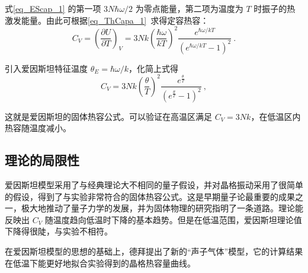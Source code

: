 式\autoref{eq_EScap_1} 的第一项 $3N \hbar\omega/2$ 为零点能量，第二项为温度为 $T$ 时振子的热激发能量。由此可根据\autoref{eq_ThCapa_1}~求得定容热容：
\begin{equation}
C_V=\left(\frac{\partial U}{\partial T}\right)_V=3Nk\left(\frac{\hbar \omega}{kT}\right)^2\frac{e^{\hbar \omega/kT}}{(e^{\hbar \omega/kT}-1)^2}~.
\end{equation}

引入爱因斯坦特征温度 $\theta_E=\hbar\omega/k$，化简上式得
\begin{equation}\label{eq_EScap_2}
C_V=3Nk\left(\frac{\theta}{T}\right)^2\frac{e^{\frac{\theta}{T}}}{(e^{\frac{\theta}{T}}-1)^2}~,
\end{equation}

这就是爱因斯坦的固体热容公式。可以验证在高温区满足 $C_V=3Nk$，在低温区内热容随温度减小。

\subsection{理论的局限性}
爱因斯坦模型采用了与经典理论大不相同的量子假设，并对晶格振动采用了很简单的假设，得到了与实验非常符合的固体热容公式。这是早期量子论最重要的成果之一，极大地推动了量子力学的发展，并为固体物理的研究指明了一条道路。理论能反映出 $C_V$ 随温度趋向低温时下降的基本趋势。但是在低温范围，爱因斯坦理论值下降得很陡，与实验不相符。

在爱因斯坦模型的思想的基础上，德拜提出了新的“声子气体”模型，它的计算结果在低温下能更好地拟合实验得到的晶格热容量曲线。
